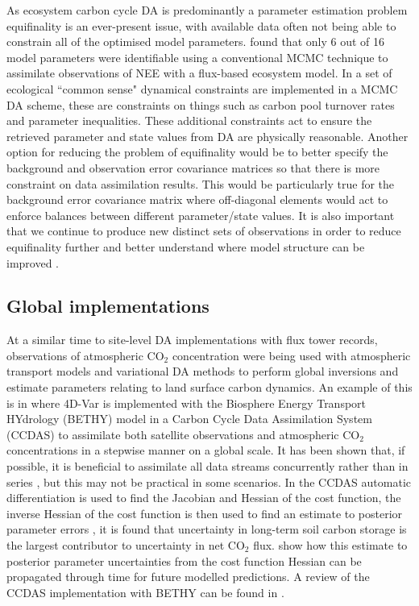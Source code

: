 As ecosystem carbon cycle DA is predominantly a parameter estimation problem equifinality is an ever-present issue, with available data often not being able to constrain all of the optimised model parameters. \citet{Wu01012009} found that only 6 out of 16 model parameters were identifiable using a conventional MCMC technique to assimilate observations of NEE with a flux-based ecosystem model. In \citet{Bloom2015} a set of ecological ``common sense" dynamical constraints are implemented in a MCMC DA scheme, these are constraints on things such as carbon pool turnover rates and parameter inequalities. These additional constraints act to ensure the retrieved parameter and state values from DA are physically reasonable. Another option for reducing the problem of equifinality would be to better specify the background and observation error covariance matrices so that there is more constraint on data assimilation results. This would be particularly true for the background error covariance matrix where off-diagonal elements would act to enforce balances between different parameter/state values. It is also important that we continue to produce new distinct sets of observations in order to reduce equifinality further and better understand where model structure can be improved \citep{Carvalhais2010}.    



\subsection{Global implementations}

At a similar time to site-level DA implementations with flux tower records, observations of atmospheric CO\(_{2}\) concentration were being used with atmospheric transport models and variational DA methods to perform global inversions and estimate parameters relating to land surface carbon dynamics. An example of this is in \citet{rayner2005two} where 4D-Var is implemented with the Biosphere Energy Transport HYdrology (BETHY) model \citep{knorr2001uncertainties} in a Carbon Cycle Data Assimilation System (CCDAS) to assimilate both satellite observations and atmospheric CO\(_{2}\) concentrations in a stepwise manner on a global scale. It has been shown that, if possible, it is beneficial to assimilate all data streams concurrently rather than in series \citep{macbean2016consistent}, but this may not be practical in some scenarios. In the CCDAS automatic differentiation is used to find the Jacobian and Hessian of the cost function, the inverse Hessian of the cost function is then used to find an estimate to posterior parameter errors \citep{rayner2005two}, it is found that uncertainty in long-term soil carbon storage is the largest contributor to uncertainty in net CO\(_{2}\) flux. \citet{scholze2007propagating} show how this estimate to posterior parameter uncertainties from the cost function Hessian can be propagated through time for future modelled predictions. A review of the CCDAS implementation with BETHY can be found in \citet{Kaminski2013}. 

